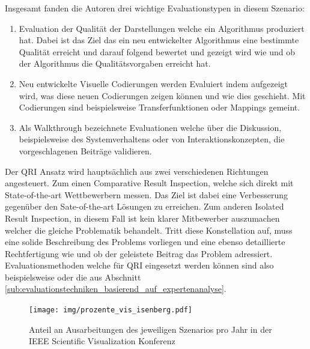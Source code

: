 \documentclass[draft=false
              ,paper=a4
              ,twoside=false
              ,fontsize=11pt
              ,headsepline
              ,BCOR10mm
              ,DIV11
              ]{scrbook}
\begin{document}
Insgesamt fanden die Autoren drei wichtige Evaluationstypen in diesem Szenario:

\begin{enumerate}
  \item Evaluation der Qualität der Darstellungen welche ein Algorithmus produziert hat. Dabei ist das Ziel das ein neu entwickelter Algorithmus eine bestimmte Qualität erreicht und darauf folgend bewertet und gezeigt wird wie und ob der Algorithmus die Qualitätsvorgaben erreicht hat.  
  \item Neu entwickelte Visuelle Codierungen werden Evaluiert indem aufgezeigt wird, was diese neuen Codierungen zeigen können und wie dies geschieht. Mit Codierungen sind beispielsweise Transferfunktionen oder Mappings gemeint.
  \item Als Walkthrough bezeichnete Evaluationen welche über die Diskussion, beispielsweise des Systemverhaltens oder von Interaktionskonzepten, die vorgeschlagenen Beiträge validieren.
\end{enumerate}

Der QRI Ansatz wird hauptsächlich aus zwei verschiedenen Richtungen angesteuert. Zum einen Comparative Result Inspection, welche sich direkt mit State-of-the-art Wettbewerbern messen. Das Ziel ist dabei eine Verbesserung gegenüber den Sate-of-the-art Lösungen zu erreichen. Zum anderen Isolated Result Inspection, in diesem Fall ist kein klarer Mitbewerber auszumachen welcher die gleiche Problematik behandelt. Tritt diese Konstellation auf, muss eine solide Beschreibung des Problems vorliegen und eine ebenso detaillierte Rechtfertigung wie und ob der geleistete Beitrag das Problem adressiert. Evaluationsmethoden welche für QRI eingesetzt werden können sind also beispielsweise  oder die  aus Abschnitt \ref{sub:evaluationstechniken_basierend_auf_expertenanalyse}.

\begin{figure}[htbp]
  \centering
  \texttt{[image: img/prozente\_vis\_isenberg.pdf]}
  \caption{Anteil an Ausarbeitungen des jeweiligen Szenarios pro Jahr in der IEEE Scientific Visualization Konferenz}
  \label{fig:szenarien2}
\end{figure}
\end{document}
